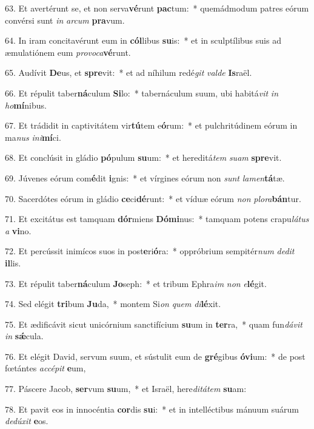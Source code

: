 63. Et avertérunt se, et non serva\textbf{vé}runt \textbf{pac}tum:~*  quemádmodum patres eórum convérsi sunt \textit{in} \textit{ar}\textit{cum} \textbf{pra}vum.\

64. In iram concitavérunt eum in \textbf{cól}libus \textbf{su}is:~*  et in sculptílibus suis ad æmulatiónem eum \textit{pro}\textit{vo}\textit{ca}\textbf{vé}runt.\

65. Audívit \textbf{De}us, et \textbf{spre}vit:~*  et ad níhilum redé\textit{git} \textit{val}\textit{de} \textbf{Is}raël.\

66. Et répulit taber\textbf{ná}culum \textbf{Si}lo:~*  tabernáculum suum, ubi habitá\textit{vit} \textit{in} \textit{ho}\textbf{mí}nibus.\

67. Et trádidit in captivitátem vir\textbf{tú}tem e\textbf{ó}rum:~*  et pulchritúdinem eórum in ma\textit{nus} \textit{in}\textit{i}\textbf{mí}ci.\

68. Et conclúsit in gládio \textbf{pó}pulum \textbf{su}um:~*  et hereditá\textit{tem} \textit{su}\textit{am} \textbf{spre}vit.\

69. Júvenes eórum com\textbf{é}dit \textbf{i}gnis:~*  et vírgines eórum non \textit{sunt} \textit{la}\textit{men}\textbf{tá}tæ.\

70. Sacerdótes eórum in gládio \textbf{ce}ci\textbf{dé}runt:~*  et víduæ eórum \textit{non} \textit{plo}\textit{ra}\textbf{bán}tur.\

71. Et excitátus est tamquam \textbf{dór}miens \textbf{Dó}\textbf{mi}nus:~*  tamquam potens crapu\textit{lá}\textit{tus} \textit{a} \textbf{vi}no.\

72. Et percússit inimícos suos in post\textbf{e}ri\textbf{ó}ra:~*  oppróbrium sempitér\textit{num} \textit{de}\textit{dit} \textbf{il}lis.\

73. Et répulit taber\textbf{ná}culum \textbf{Jo}seph:~*  et tribum Ephra\textit{im} \textit{non} \textit{e}\textbf{lé}git.\

74. Sed elégit \textbf{tri}bum \textbf{Ju}da,~*  montem Si\textit{on} \textit{quem} \textit{di}\textbf{lé}xit.\

75. Et ædificávit sicut unicórnium sanctifícium \textbf{su}um in \textbf{ter}ra,~*  quam fun\textit{dá}\textit{vit} \textit{in} \textbf{sǽ}cula.\

76. Et elégit David, servum suum, et sústulit eum de \textbf{gré}gibus \textbf{ó}\textbf{vi}um:~*  de post fœtántes \textit{ac}\textit{cé}\textit{pit} \textbf{e}um,\

77. Páscere Jacob, \textbf{ser}vum \textbf{su}um,~*  et Israël, here\textit{di}\textit{tá}\textit{tem} \textbf{su}am:\

78. Et pavit eos in innocéntia \textbf{cor}dis \textbf{su}i:~*  et in intelléctibus mánuum suárum \textit{de}\textit{dú}\textit{xit} \textbf{e}os.\

